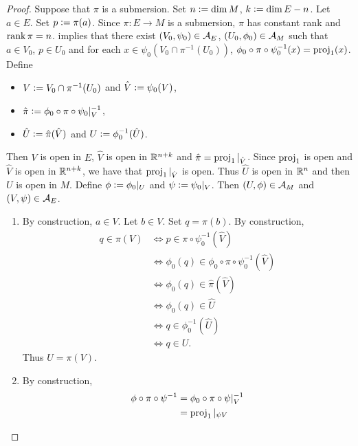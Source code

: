 \documentclass{book}
\begin{document}
	\begin{proof}
		Suppose that $\pi$ is a submersion. Set $n \vcentcolon= \dim M$, $k \vcentcolon= \dim E - n$. Let $a \in E$. Set $p \vcentcolon= \pi(a)$. Since $\pi:E \rightarrow M$ is a submersion, $\pi$ has constant rank and $\operatorname{\text{rank}} \pi = n$.  implies that there exist $(V_0, \psi_0) \in \mathcal{A}_E$, $(U_0, \phi_0) \in \mathcal{A}_M$ such that $a \in V_0$, $p \in U_0$ and for each $x \in \psi_0(V_0 \cap \pi^{-1}(U_0))$, $\phi_0 \circ \pi \circ \psi_0^{-1}(x) = \operatorname{\text{proj}}_1(x)$. Define
		\begin{itemize}
			\item $V \vcentcolon= V_0 \cap \pi^{-1}(U_0)$ and $\hat{V} \vcentcolon= \psi_0(V)$,
			\item $\hat{\pi} \vcentcolon= \phi_0 \circ \pi \circ \psi_0|_{V}^{-1}$,
			\item $\hat{U} \vcentcolon= \hat{\pi}(\hat{V})$ and $U \vcentcolon= \phi_0^{-1}(\hat{U})$.
		\end{itemize}
		Then $V$ is open in $E$, $\hat{V}$ is open in $\mathbb{R}^{n+k}$ and $\hat{\pi} = \operatorname{\text{proj}}_1|_{\hat{V}}$. Since $\operatorname{\text{proj}}_1$ is open and $\hat{V}$ is open in $\mathbb{R}^{n+k}$, we have that $\operatorname{\text{proj}}_1|_{\hat{V}}$ is open. Thus $\hat{U}$ is open in $\mathbb{R}^n$ and then $U$ is open in $M$. Define $\phi \vcentcolon= \phi_0|_U$ and $\psi \vcentcolon= \psi_0|_V$. Then $(U, \phi) \in \mathcal{A}_M$ and $(V, \psi) \in \mathcal{A}_E$.
		\begin{enumerate}
			\item By construction, $a \in V$. Let $b \in V$. Set $q = \pi(b)$. By construction,
			\begin{align*}
				q \in \pi(V)
				& \iff p \in \pi \circ \psi_0^{-1}(\hat{V}) \\
				& \iff \phi_0(q) \in \phi_0 \circ \pi \circ \psi_0^{-1}(\hat{V}) \\
				& \iff \phi_0(q) \in \hat{\pi}(\hat{V}) \\
				& \iff \phi_0(q) \in \hat{U} \\
				& \iff q \in \phi_0^{-1}(\hat{U}) \\
				& \iff q \in U.
			\end{align*}
			Thus $U = \pi(V)$.
			\item By construction, 
			\begin{align*}
				\phi \circ \pi \circ \psi^{-1}
				& = \phi_0 \circ \pi \circ \psi|_V^{-1} \\
				& = \operatorname{\text{proj}}_1|_{\psi{V}}
			\end{align*}
		\end{enumerate}
	\end{proof}
\end{document}
